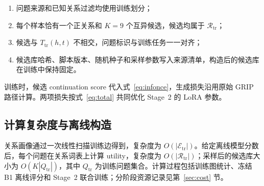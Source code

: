 \begin{enumerate}
    \item 问题来源和已知关系过滤均使用训练划分；
    \item 每个样本恰有一个正关系和 $K=9$ 个互异候选，候选均属于 $\mathcal{R}_{\mathrm{tr}}$；
    \item 候选与 $T_{\mathrm{tr}}(h,t)$ 不相交，问题标识与训练任务一一对齐；
    \item 候选库哈希、脚本版本、随机种子和采样参数写入来源清单，构造后的候选库在训练中保持固定。
\end{enumerate}

训练时，候选 continuation score 代入式~\ref{eq:infonce}，生成损失沿用原始 GRIP 路径计算。两项损失按式~\ref{eq:total} 共同优化 Stage~2 的 LoRA 参数。

\subsection{计算复杂度与离线构造}

关系画像通过一次线性扫描训练边得到，复杂度为 $O(|\mathcal{E}_{\mathrm{tr}}|)$。给定离线模型分数后，每个问题在关系词表上计算 utility，复杂度为 $O(|\mathcal{R}_{\mathrm{tr}}|)$；采样后的候选库大小为 $O(K|Q_{\mathrm{tr}}|)$，其中 $Q_{\mathrm{tr}}$ 为训练问题集合。计算过程包括训练图统计、冻结 B1 离线评分和 Stage~2 联合训练；分阶段资源记录见第~\ref{sec:cost} 节。
